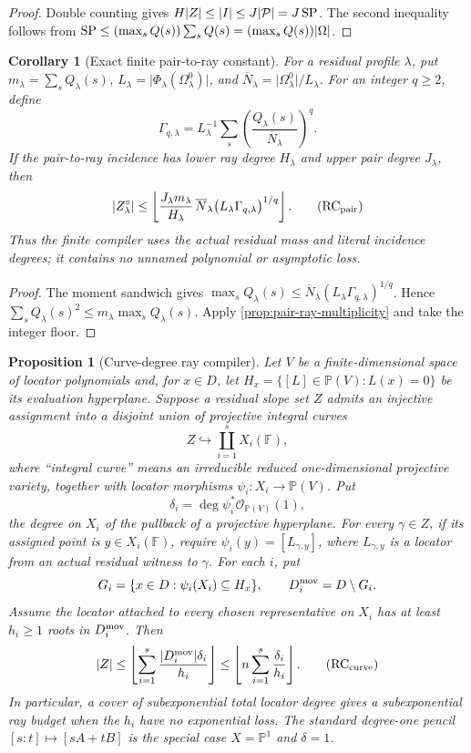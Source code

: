\documentclass[12pt,a4paper]{amsart}
\numberwithin{equation}{section}
\newtheorem{proposition}[proposition]{Proposition}
\newtheorem{corollary}[corollary]{Corollary}
\theoremstyle{remark}
\newcommand{\F}{\mathbb F}
\newcommand{\Pj}{\mathbb P}
\newcommand{\barN}{\overline N}
\newcommand{\abs}[1]{\lvert #1\rvert}
\newcommand{\floor}[1]{\left\lfloor #1\right\rfloor}
\begin{document}
\begin{proof}
Double counting gives
\(H\abs Z\le\abs I\le J\abs{\mathcal P}=J\,{\rm SP}\).  The second
inequality follows from
\({\rm SP}\le(\max_sQ(s))\sum_sQ(s)=(\max_sQ(s))\abs\Omega\).
\end{proof}

\begin{corollary}[Exact finite pair-to-ray constant]
\label{cor:finite-pair-ray-compiler}
For a residual profile \(\lambda\), put
\(m_\lambda=\sum_sQ_\lambda(s)\),
\(L_\lambda=\abs{\Phi_\lambda(\Omega^0_\lambda)}\), and
\(\barN_\lambda=\abs{\Omega^0_\lambda}/L_\lambda\).  For an integer
\(q\ge2\), define
\[
 \Gamma_{q,\lambda}=L_\lambda^{-1}\sum_s
 \left(\frac{Q_\lambda(s)}{\barN_\lambda}\right)^q.
\]
If the pair-to-ray incidence has lower ray degree \(H_\lambda\) and upper
pair degree \(J_\lambda\), then
\[
 \abs{Z_\lambda^\circ}\le
 \floor{\frac{J_\lambda m_\lambda}{H_\lambda}\,
  \barN_\lambda
  \bigl(L_\lambda\Gamma_{q,\lambda}\bigr)^{1/q}}.   \tag{RC$_{\rm pair}$}
\]
Thus the finite compiler uses the actual residual mass and literal
incidence degrees; it contains no unnamed polynomial or asymptotic loss.
\end{corollary}

\begin{proof}
The moment sandwich gives
\(\max_sQ_\lambda(s)\le\barN_\lambda
(L_\lambda\Gamma_{q,\lambda})^{1/q}\).  Hence
\(\sum_sQ_\lambda(s)^2\le m_\lambda\max_sQ_\lambda(s)\).
Apply \cref{prop:pair-ray-multiplicity} and take the integer floor.
\end{proof}

\begin{proposition}[Curve-degree ray compiler]
\label{prop:curve-degree-ray-compiler}
Let \(V\) be a finite-dimensional space of locator polynomials and, for
\(x\in D\), let
\(H_x=\{[L]\in\Pj(V):L(x)=0\}\) be its \emph{evaluation hyperplane}.
Suppose a residual slope set \(Z\) admits an injective assignment into a
disjoint union of projective integral curves
\[
              Z\hookrightarrow\coprod_{i=1}^sX_i(\F),
\]
where ``integral curve'' means an irreducible reduced one-dimensional
projective variety, together with locator morphisms
\(\psi_i:X_i\to\Pj(V)\).  Put
\[
 \delta_i=\deg\psi_i^*\mathcal O_{\Pj(V)}(1),
\]
the degree on \(X_i\) of the pullback of a projective hyperplane.  For
every \(\gamma\in Z\), if its assigned point is \(y\in X_i(\F)\), require
\(\psi_i(y)=[L_{\gamma,y}]\), where \(L_{\gamma,y}\) is a locator from an
actual residual witness to \(\gamma\).  For each \(i\), put
\[
 G_i=\{x\in D:\psi_i(X_i)\subseteq H_x\},
 \qquad D_i^{\rm mov}=D\setminus G_i.
\]
Assume the locator attached to every chosen representative on \(X_i\)
has at least \(h_i\ge1\) roots in \(D_i^{\rm mov}\).  Then
\[
 \abs Z\le
 \floor{\sum_{i=1}^s
       \frac{\abs{D_i^{\rm mov}}\delta_i}{h_i}}
 \le\floor{n\sum_{i=1}^s\frac{\delta_i}{h_i}}.
 \tag{RC$_{\rm curve}$}
\]
In particular, a cover of subexponential total locator degree gives a
subexponential ray budget when the \(h_i\) have no exponential loss.  The
standard degree-one pencil \([s:t]\mapsto[sA+tB]\) is the special case
\(X=\Pj^1\) and \(\delta=1\).
\end{proposition}
\end{document}
